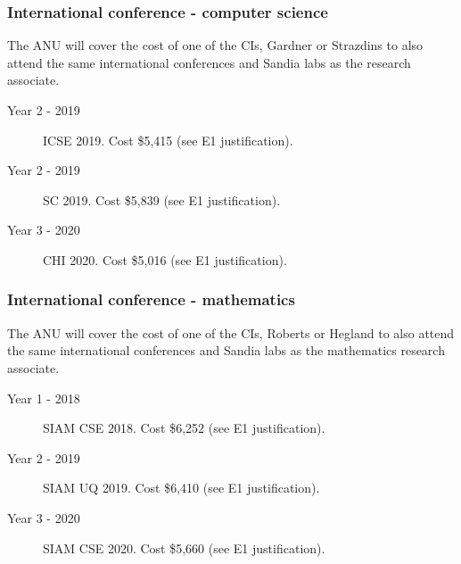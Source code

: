 \documentclass[a4paper,fontsize=12pt]{scrartcl}
\begin{document}
\subsubsection*{International conference - computer science}


The ANU will cover the cost of one of the CIs, Gardner or Strazdins 
to also attend the same international conferences and Sandia labs as the 
research associate. 


\begin{description}
\item[Year 2 - 2019] ICSE 2019. Cost \$5,415  (see E1 justification).

\item[Year 2 - 2019] SC 2019.  Cost \$5,839  (see E1 justification).

\item[Year 3 - 2020] CHI 2020.  Cost \$5,016 (see E1 justification).

\end{description}


\subsubsection*{International conference - mathematics}

The ANU will cover the cost of one of the CIs, Roberts or Hegland 
to also attend the same international conferences and Sandia labs as the 
mathematics research associate. 


\begin{description}
\item[Year 1 - 2018] SIAM CSE 2018.  Cost \$6,252   (see E1 justification).

\item[Year 2 - 2019] SIAM UQ 2019.  Cost \$6,410  (see E1 justification).

\item[Year 3 - 2020]  SIAM CSE 2020.  Cost \$5,660   (see E1 justification).

\end{description}
\end{document}
